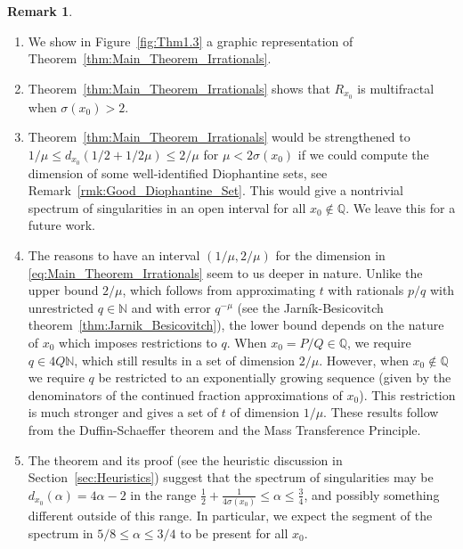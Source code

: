 \documentclass[11pt,reqno]{amsart}
\theoremstyle{definition}
\newtheorem{rem}[thm]{Remark}
\begin{document}
\begin{rem} %
\begin{enumerate}
	\item[(a)] We show in Figure~\ref{fig:Thm1.3} a graphic representation of Theorem~\ref{thm:Main_Theorem_Irrationals}.
	\item[(b)] Theorem~\ref{thm:Main_Theorem_Irrationals}  
	shows that $R_{x_0}$ is multifractal when $\sigma(x_0) > 2$. 
	\item[(c)] Theorem~\ref{thm:Main_Theorem_Irrationals} would be strengthened to $1/\mu \leq d_{x_0}(1/2 + 1/2\mu) \leq 2/\mu$ for $\mu < 2\sigma(x_0)$ if we could compute the dimension of some well-identified Diophantine sets, see Remark~\ref{rmk:Good_Diophantine_Set}. 
	This would give a nontrivial spectrum of singularities in an open interval for all $x_0 \not\in \mathbb Q$. 
	We leave this for a future work. 
	
	\item[(d)] The reasons to have an interval $(1/\mu, 2/\mu)$ for the dimension in \eqref{eq:Main_Theorem_Irrationals} seem to us deeper in nature. 
Unlike the upper bound  $2/\mu$, which follows from approximating $t$ with rationals $p/q$ with unrestricted $q\in \mathbb N$ and with error $q^{-\mu}$ (see the Jarn\'ik-Besicovitch theorem~\ref{thm:Jarnik_Besicovitch}), 
the lower bound depends on the nature of $x_0$ which imposes restrictions to $q$. 
When $x_0 = P/Q \in \mathbb Q$, we require $q \in 4Q\mathbb N$, which still results in a set of dimension $2/\mu$.
However, when $x_0 \not\in \mathbb Q$ we require $q$ be restricted to an exponentially growing sequence (given by the denominators of the continued fraction approximations of $x_0$). This restriction is much stronger and gives a set of $t$ of dimension $1/\mu$. 
These results follow from the Duffin-Schaeffer theorem and the Mass Transference Principle. 
	  
	
	\item[(e)] The theorem and its proof (see the heuristic discussion in Section~\ref{sec:Heuristics}) suggest that the spectrum of singularities may be $d_{x_0}(\alpha) = 4\alpha - 2$ in the range 
	$\frac12 + \frac{1}{4\sigma(x_0)} \leq \alpha \leq \frac34$, 
	and possibly something different outside of this range.
	In particular, we expect the segment of the spectrum in $5/8 \leq \alpha \leq 3/4$ to be present for all $x_0$. 
\end{enumerate}
\end{rem}
\end{document}
